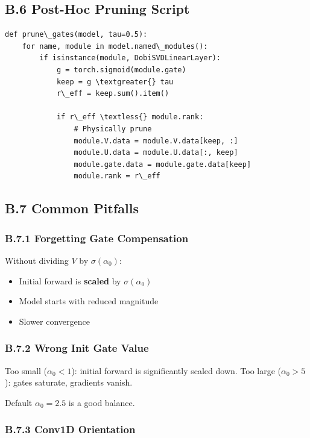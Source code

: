 \subsection{B.6 Post-Hoc Pruning Script}

\begin{lstlisting}
def prune\_gates(model, tau=0.5):
    for name, module in model.named\_modules():
        if isinstance(module, DobiSVDLinearLayer):
            g = torch.sigmoid(module.gate)
            keep = g \textgreater{} tau
            r\_eff = keep.sum().item()
            
            if r\_eff \textless{} module.rank:
                # Physically prune
                module.V.data = module.V.data[keep, :]
                module.U.data = module.U.data[:, keep]
                module.gate.data = module.gate.data[keep]
                module.rank = r\_eff
\end{lstlisting}

\subsection{B.7 Common Pitfalls}

\subsubsection{B.7.1 Forgetting Gate Compensation}

Without dividing $V$ by $\sigma(\alpha_0)$:
\begin{itemize}
\item Initial forward is \textbf{scaled} by $\sigma(\alpha_0)$
\item Model starts with reduced magnitude
\item Slower convergence

\end{itemize}
\subsubsection{B.7.2 Wrong Init Gate Value}

Too small ($\alpha_0 < 1$): initial forward is significantly scaled down.
Too large ($\alpha_0 > 5$): gates saturate, gradients vanish.

Default $\alpha_0 = 2.5$ is a good balance.

\subsubsection{B.7.3 Conv1D Orientation}

